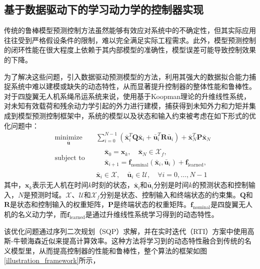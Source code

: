 \documentclass[lang=chs, degree=master, blindreview=false, winfonts=true]{yanputhesis}
\begin{document}
\subsection{基于数据驱动下的学习动力学的控制器实现}

传统的鲁棒模型预测控制方法虽然能够有效应对系统中的不确定性，但其实际应用往往受到严格假设条件的限制，难以完全满足实际工程需求。此外，模型预测控制的闭环性能在很大程度上依赖于其内部模型的准确性，模型误差可能导致控制效果的下降。

为了解决这些问题，引入数据驱动预测模型的方法，利用其强大的数据拟合能力捕捉系统中难以建模或缺失的动态特性，从而显著提升控制器的整体性能和鲁棒性。
对于四旋翼无人机系绳吊运系统来说，使用基于Koopman理论的升维线性系统，对未知有效载荷和残余动力学引起的外力进行建模，捕获得到未知外力和力矩并集成到模型预测控制框架中，系统的模型以及状态和输入约束被考虑在如下形式的优化问题中：
\begin{equation}
	\begin{aligned} \label{nmpc}
		&\operatorname*{minimize}_{\bm{\bar{u}}}& & \sum_{i=0}^{N-1}\left(\bm{\bar{x}}_i^T\bm{Q}\bm{\bar{x}}_i + \bm{\bar{u}}_i^T\bm{R}\bm{\bar{u}}_i\right) + \bm{\bar{x}}_N^T\bm{P}\bm{\bar{x}}_N  \\
		&\text{subject to}& & \begin{aligned}
			&\bm{\bar{x}}_{0} = \bm{x}_k, \quad \bm{\bar{x}}_{N} \in \mathcal{X}_f, \\
			&\bm{\bar{x}}_{i+1} = \bm{f}_{\text{nominal}}(\bm{\bar{x}}_i, \bm{\bar{u}}_i) + \bm{f}_{\text{learned}},
		\end{aligned} \\
		&&& \bm{\bar{x}}_i \in \mathcal{X}, \quad \bm{\bar{u}}_i \in \mathcal{U}, \quad \forall i = 0, \ldots, N-1
	\end{aligned}
\end{equation}
其中，$\bm{x}_k$表示无人机在时间$k$时刻的状态，$\bm{\bar{x}}_i$和$\bm{\bar{u}}_i$分别是时间$k$的预测状态和控制输入，$N$是预测时域。$\mathcal{X}$、$\mathcal{U}$和$\mathcal{X}_f$分别是状态、控制输入和终端状态的约束集。$\bm{Q}$和$\bm{R}$是状态和控制输入的权重矩阵，$\bm{P}$是终端状态的权重矩阵。$\bm{f}_{\text{nominal}}$是四旋翼无人机的名义动力学，而$\bm{f}_{\text{learned}}$是通过升维线性系统学习得到的动态特性。

该优化问题通过序列二次规划（SQP）求解，并在实时迭代（RTI）方案中使用高斯-牛顿海森近似来提高计算效率。这种方法将学习到的动态特性融合到传统的名义模型里，从而提高控制器的性能和鲁棒性，整个算法的框架如图\ref{illustration_framework}所示，
\end{document}

